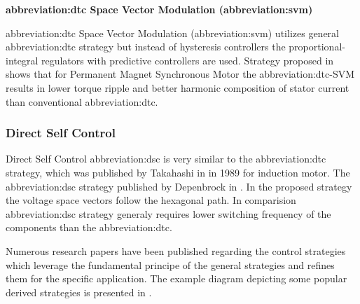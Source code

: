 \documentclass[a4paper, twoside, 11pt]{article}
\begin{document}
            \vspace*{1.5cm}
             \hspace*{-\parindent} \textbf{\gls{abbreviation:dtc} Space Vector Modulation (\gls{abbreviation:svm})}\par
            \hspace*{\parindent} \gls{abbreviation:dtc} Space Vector Modulation (\gls{abbreviation:svm}) utilizes general \gls{abbreviation:dtc} strategy but instead of hysteresis controllers the proportional-integral regulators with predictive controllers are used. Strategy proposed in \cite{swierczynski-dsp-based-direct-torque-control-of-permanent-magnet-synchronous-motor-using-space-vector-modulation-dtcsvm} shows that for Permanent Magnet Synchronous Motor the \gls{abbreviation:dtc}-SVM results in lower torque ripple and better harmonic composition of stator current than conventional \gls{abbreviation:dtc}.

        \subsubsection{Direct Self Control}
            Direct Self Control \gls{abbreviation:dsc} is very similar to the \gls{abbreviation:dtc} strategy, which was published by Takahashi in \cite{takahashi-high-performance-direct-torque-control-of-an-iduction-motor} in 1989 for induction motor. The \gls{abbreviation:dsc} strategy published by Depenbrock in \cite{depenbrock-direct-self-control-of-inverter-fed-induction-machine}. In the proposed strategy the voltage space vectors follow the hexagonal path. In comparision \gls{abbreviation:dsc} strategy generaly requires lower switching frequency of the components than the \gls{abbreviation:dtc}.

        \par
        \vspace*{1.5cm}
        Numerous research papers have been published regarding the control strategies which leverage the fundamental principe of the general strategies and refines them for the specific application. The example diagram depicting some popular derived strategies is presented in \cite{heidari-a-review-of-synchronour-relucatence-motor-drive-advancements}.
\end{document}
